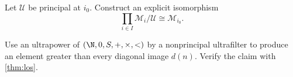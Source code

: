 \begin{exercise}
\label{ex:types-ultraproducts-04}
Let \(\mathcal U\) be principal at \(i_0\).  Construct an explicit isomorphism
\[
  \prod_{i\in I}\mathcal M_i/\mathcal U\cong\mathcal M_{i_0}.
\]
\end{exercise}

\begin{exercise}
\label{ex:types-ultraproducts-05}
Use an ultrapower of \((\N,0,S,+,\times,<)\) by a nonprincipal ultrafilter to
produce an element greater than every diagonal image \(d(n)\).  Verify the
claim with \cref{thm:los}.
\end{exercise}

